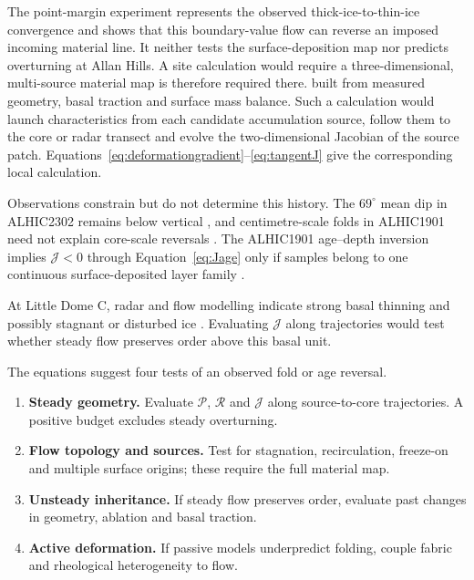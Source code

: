 \documentclass[review]{igs}
\providecommand{\DIFadd}[1]{{\protect\color{blue} \sf #1}} %
\providecommand{\DIFdel}[1]{{\protect\color{red} \scriptsize #1}} %
\providecommand{\DIFaddbegin}{} %
\providecommand{\DIFaddend}{} %
\providecommand{\DIFdelbegin}{} %
\providecommand{\DIFdelend}{} %
\newcommand{\DIFscaledelfig}{0.5}
\newlength{\DIFdelgraphicswidth} %
\newlength{\DIFdelgraphicsheight} %
\newcommand{\DIFaddincludegraphics}[2][]{{\color{blue}\fbox{\DIFOincludegraphics[#1]{#2}}}} %
\newcommand{\DIFdelincludegraphics}[2][]{%
\sbox{\DIFdelgraphicsbox}{\DIFOincludegraphics[#1]{#2}}%
\settoboxwidth{\DIFdelgraphicswidth}{\DIFdelgraphicsbox} %
\settoboxtotalheight{\DIFdelgraphicsheight}{\DIFdelgraphicsbox} %
\scalebox{\DIFscaledelfig}{%
\parbox[b]{\DIFdelgraphicswidth}{\usebox{\DIFdelgraphicsbox}\\[-\baselineskip] \rule{\DIFdelgraphicswidth}{0em}}\llap{\resizebox{\DIFdelgraphicswidth}{\DIFdelgraphicsheight}{%
\setlength{\unitlength}{\DIFdelgraphicswidth}%
\begin{picture}(1,1)%
\thicklines\linethickness{2pt} %
{\color[rgb]{1,0,0}\put(0,0){\framebox(1,1){}}}%
{\color[rgb]{1,0,0}\put(0,0){\line( 1,1){1}}}%
{\color[rgb]{1,0,0}\put(0,1){\line(1,-1){1}}}%
\end{picture}%
}\hspace*{3pt}}} %
} %
\DeclareRobustCommand{\DIFaddbegin}{\DIFOaddbegin \let\includegraphics\DIFaddincludegraphics} %
\DeclareRobustCommand{\DIFaddend}{\DIFOaddend \let\includegraphics\DIFOincludegraphics} %
\DeclareRobustCommand{\DIFdelbegin}{\DIFOdelbegin \let\includegraphics\DIFdelincludegraphics} %
\DeclareRobustCommand{\DIFdelend}{\DIFOaddend \let\includegraphics\DIFOincludegraphics} %
\begin{document}
\DIFadd{The point-margin experiment represents the observed thick-ice-to-thin-ice convergence and shows that this boundary-value flow can reverse an imposed incoming material line. It neither tests the surface-deposition map nor predicts overturning at Allan Hills. A site calculation would require a }\DIFaddend three-dimensional, multi-source material map \DIFdelbegin \DIFdel{is therefore required there. }\DIFdelend \DIFaddbegin \DIFadd{built from measured geometry, basal traction and surface mass balance. Such a calculation would launch characteristics from each candidate accumulation source, follow them to the core or radar transect and evolve the two-dimensional Jacobian of the source patch. Equations~\ref{eq:deformationgradient}--\ref{eq:tangentJ} give the corresponding local calculation.
}\DIFaddend 

Observations constrain but do not determine this history. The \(69^{\circ}\) mean dip in ALHIC2302 remains below vertical \citep{Kirkpatrick2025}, and centimetre-scale folds in ALHIC1901 need not explain core-scale reversals \citep{Stoll2026}. The ALHIC1901 age--depth inversion implies \(\mathcal{J}<0\) through Equation~\ref{eq:Jage} only if samples belong to one continuous surface-deposited layer family \citep{Shackleton2025}.

At Little Dome C, radar and flow modelling indicate strong basal thinning and possibly stagnant or disturbed ice \citep{Lilien2021,Chung2025BeyondEPICA}. Evaluating \(\mathcal{J}\) along trajectories would test whether steady flow preserves order above this basal unit.

The equations suggest four tests of an observed fold or age reversal.

\begin{enumerate}[leftmargin=*,label=(\arabic*)]
  \item \textbf{Steady geometry.} Evaluate \(\mathcal{P}\), \(\mathcal{R}\) and \(\mathcal{J}\) along source-to-core trajectories. A positive budget excludes steady overturning.
  \item \textbf{Flow topology and sources.} Test for stagnation, recirculation, freeze-on and multiple surface origins; these require the full material map.
  \item \textbf{Unsteady inheritance.} If steady flow preserves order, evaluate past changes in geometry, ablation and basal traction.
  \item \textbf{Active deformation.} If passive models underpredict folding, couple fabric and rheological heterogeneity to flow.
\end{enumerate}
\end{document}
